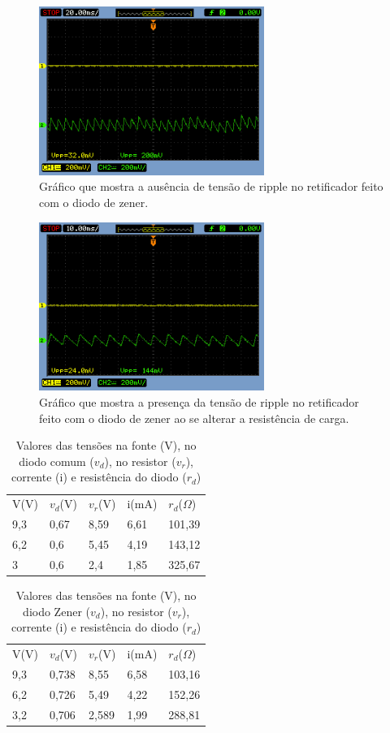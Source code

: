 \documentclass{article}
\begin{document}
\begin{figure}[h!]
    \centering
    \includegraphics[height=5.5cm]{imgSource/zenerNoRipple.png}
    \caption{Gráfico que mostra a ausência de tensão de ripple no retificador feito com o diodo de zener.}
    \label{fig:zenerNoRipple}
\end{figure}

\begin{figure}[h!]
    \centering
    \includegraphics[height=5.5cm]{imgSource/zenerRipple.png}
    \caption{Gráfico que mostra a presença da tensão de ripple no retificador feito com o diodo de zener ao se alterar a resistência de carga.}
    \label{fig:zenerRipple}
\end{figure}

\begin{table}[h!]
    \label{tab: tensao-diodo}
    \begin{tabular}{|l|l|l|l|l|}
    V(V)   & $v_d$(V)   & $v_r$(V)   & i(mA)    & $r_d$($\Omega$)     \\
    9,3 & 0,67 & 8,59 & 6,61 & 101,39 \\
    6,2 & 0,6  & 5,45 & 4,19 & 143,12 \\
    3   & 0,6  & 2,4  & 1,85 & 325,67
    \end{tabular}
    \caption{Valores das tensões na fonte (V), no diodo comum ($v_d$), no resistor ($v_r$), corrente (i) e resistência do diodo ($r_d$) }
\end{table}

\begin{table}[h!]
    \label{tab: tensao-zener}
    \begin{tabular}{|l|l|l|l|l|}
    V(V)   & $v_d$(V)   & $v_r$(V)   & i(mA)    & $r_d$($\Omega$)     \\
    9,3 & 0,738 & 8,55  & 6,58 & 103,16 \\
    6,2 & 0,726 & 5,49  & 4,22 & 152,26 \\
    3,2 & 0,706 & 2,589 & 1,99 & 288,81
    \end{tabular}
    \caption{Valores das tensões na fonte (V), no diodo Zener ($v_d$), no resistor ($v_r$), corrente (i) e resistência do diodo ($r_d$) }
\end{table}
\end{document}
